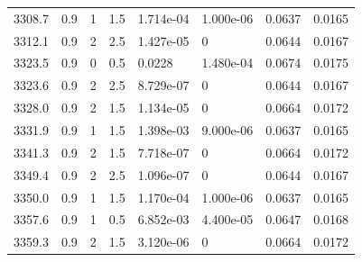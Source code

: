 \documentclass[preview]{standalone}
\begin{document}
{{{{{{{{{{{\begin{tabular}{L{1.2cm}C{1.2cm} C{0.3cm}C{0.5cm} C{1.4cm}C{1.4cm} C{1.4cm}C{1.4cm}}
  3308.7  &   0.9  & 1     & 1.5 &  1.714e-04  & 1.000e-06  & 0.0637 &  0.0165   \\ 
  3312.1  &   0.9  & 2     & 2.5 &  1.427e-05  & 0  & 0.0644 &  0.0167   \\ 
  3323.5  &   0.9  & 0     & 0.5 &  0.0228  & 1.480e-04  & 0.0674 &  0.0175   \\ 
  3323.6  &   0.9  & 2     & 2.5 &  8.729e-07  & 0  & 0.0644 &  0.0167   \\ 
  3328.0  &   0.9  & 2     & 1.5 &  1.134e-05  & 0  & 0.0664 &  0.0172   \\ 
  3331.9  &   0.9  & 1     & 1.5 &  1.398e-03  & 9.000e-06  & 0.0637 &  0.0165   \\ 
  3341.3  &   0.9  & 2     & 1.5 &  7.718e-07  & 0  & 0.0664 &  0.0172   \\ 
  3349.4  &   0.9  & 2     & 2.5 &  1.096e-07  & 0  & 0.0644 &  0.0167   \\ 
  3350.0  &   0.9  & 1     & 1.5 &  1.170e-04  & 1.000e-06  & 0.0637 &  0.0165   \\ 
  3357.6  &   0.9  & 1     & 0.5 &  6.852e-03  & 4.400e-05  & 0.0647 &  0.0168   \\ 
  3359.3  &   0.9  & 2     & 1.5 &  3.120e-06  & 0  & 0.0664 &  0.0172   \\ 
\hline 
\end{tabular} 

}}}}}}}}}}}
\end{document}

